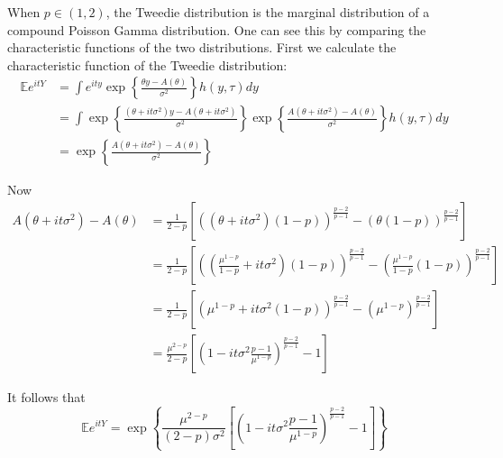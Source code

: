 \documentclass[11pt]{article}
\begin{document}
When $p \in \left( 1 , 2 \right)$, the Tweedie distribution is the marginal distribution of a compound Poisson Gamma distribution. One can see this by comparing the characteristic functions of the two distributions. First we calculate the characteristic function of the Tweedie distribution:
\begin{equation}
\begin{split}
\mathbb{E} e^{itY} & = \int e^{ity} \exp \left\{ \frac{\theta y - A \left( \theta \right)}{\sigma^2} \right\} h \left( y, \tau \right) dy \\
& = \int \exp \left\{ \frac{\left( \theta + it \sigma^2 \right)  y - A \left( \theta + it \sigma^2 \right)}{\sigma^2} \right\}
\exp \left\{ \frac{A \left( \theta + it \sigma^2 \right) - A \left( \theta \right)}{\sigma^2} \right\} h \left( y , \tau \right) dy \\
& = \exp \left\{ \frac{A \left( \theta + it \sigma^2 \right) - A \left( \theta \right)}{\sigma^2} \right\}
\end{split}
\end{equation}

Now
\begin{equation}
\begin{split}
A \left( \theta + it \sigma^2 \right) - A \left( \theta \right) & =
\frac{1}{2-p} \left[ \left( \left( \theta + it \sigma^2 \right) \left( 1 - p \right) \right)^{\frac{p-2}{p-1}}
 - \left( \theta \left( 1 - p \right) \right)^{\frac{p-2}{p-1}} \right] \\
 & = \frac{1}{2-p} \left[ \left( \left( \frac{\mu^{1-p}}{1-p} + it \sigma^2 \right) \left( 1 - p \right) \right)^{\frac{p-2}{p-1}}
 - \left( \frac{\mu^{1-p}}{1-p} \left( 1 - p \right) \right)^{\frac{p-2}{p-1}} \right] \\
 & = \frac{1}{2-p} \left[ \left( \mu^{1-p} + it \sigma^2 \left( 1 - p \right) \right)^{\frac{p-2}{p-1}}
 - \left( \mu^{1-p} \right)^{\frac{p-2}{p-1}} \right] \\
 & = \frac{\mu^{2-p}}{2-p} \left[ \left( 1 - it\sigma^2 \frac{p-1}{\mu^{1-p}} \right)^{\frac{p-2}{p-1}} - 1\right]
\end{split}
\end{equation}

It follows that
\begin{equation}
\mathbb{E} e^{itY} = \exp \left\{ \frac{\mu^{2-p}}{\left( 2 - p \right) \sigma^2} \left[ \left( 1 - it\sigma^2 \frac{p-1}{\mu^{1-p}} \right)^{\frac{p-2}{p-1}} - 1\right] \right\}
\end{equation}
\end{document}
